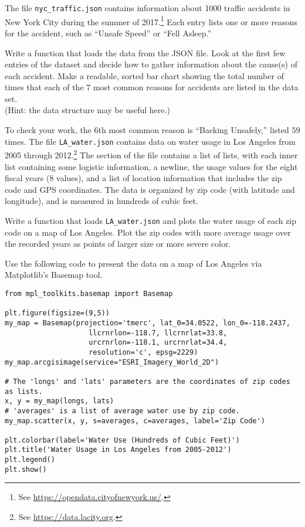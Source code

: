 The file \texttt{nyc\_traffic.json} contains information about 1000 traffic accidents in New York City during the summer of 2017.\footnote{See \url{https://opendata.cityofnewyork.us/}.}
Each entry lists one or more reasons for the accident, such as ``Unsafe Speed'' or ``Fell Asleep.''

Write a function that loads the data from the JSON file.
Look at the first few entries of the dataset and decide how to gather information about the cause(s) of each accident.
Make a readable, sorted bar chart showing the total number of times that each of the $7$ most common reasons for accidents are listed in the data set.
\\ (Hint: the  data structure may be useful here.)

To check your work, the $6$th most common reason is ``Backing Unsafely,'' listed $59$ times.
The file \texttt{LA\_water.json} contains data on water usage in Los Angeles from 2005 through 2012.\footnote{See \url{https://data.lacity.org}.}
The  section of the file contains a list of lists, with each inner list containing some logistic information, a newline, the usage values for the eight fiscal years (8 values), and a list of location information that includes the zip code and GPS coordinates.
The data is organized by zip code (with latitude and longitude), and is measured in hundreds of cubic feet.


Write a function that loads \texttt{LA\_water.json} and plots the water usage of each zip code on a map of Los Angeles.
Plot the zip codes with more average usage over the recorded years as points of larger size or more severe color.


Use the following code to present the data on a map of Los Angeles via Matplotlib's Basemap tool.

\begin{lstlisting}
from mpl_toolkits.basemap import Basemap

plt.figure(figsize=(9,5))
my_map = Basemap(projection='tmerc', lat_0=34.0522, lon_0=-118.2437,
                    llcrnrlon=-118.7, llcrnrlat=33.8,
                    urcrnrlon=-118.1, urcrnrlat=34.4,
                    resolution='c', epsg=2229)
my_map.arcgisimage(service="ESRI_Imagery_World_2D")

# The 'longs' and 'lats' parameters are the coordinates of zip codes as lists.
x, y = my_map(longs, lats)
# 'averages' is a list of average water use by zip code.
my_map.scatter(x, y, s=averages, c=averages, label='Zip Code')

plt.colorbar(label='Water Use (Hundreds of Cubic Feet)')
plt.title('Water Usage in Los Angeles from 2005-2012')
plt.legend()
plt.show()
\end{lstlisting}


